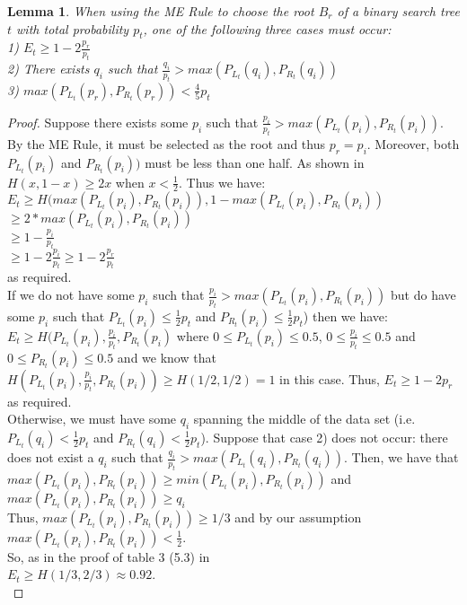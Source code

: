 \documentclass[letterpaper,12pt,titlepage,oneside,final]{book}
\theoremstyle{plain}
\newtheorem{lem}[thm]{Lemma}
\begin{document}
\begin{lem}
When using the ME Rule to choose the root $B_r$ of a binary search tree $t$ with total probability $p_t$, one of the following three cases must occur: \\
1) $E_t \geq 1-2 \frac{p_r}{p_t}$ \\
2) There exists $q_i$ such that $\frac{q_i}{p_t} > max(P_{L_t}(q_i), P_{R_t}(q_i))$\\
3)  $max(P_{L_t}(p_r), P_{R_t}(p_r)) < \frac{4}{5} p_t$\\
\end{lem}
\begin{proof}
Suppose there exists some $p_i$ such that $\frac{p_i}{p_t} > max(P_{L_t}(p_i), P_{R_t}(p_i))$. By the ME Rule, it must be selected as the root and thus $p_r=p_i$. Moreover, both $P_{L_t}(p_i)$ and $P_{R_t}(p_i))$ must be less than one half. As shown in \cite{gallager1968information} $H(x,1-x) \geq 2x$ when $x<\frac{1}{2}$. Thus we have: \\
$E_t \geq H( max(P_{L_t}(p_i), P_{R_t}(p_i)), 1-max(P_{L_t}(p_i), P_{R_t}(p_i))$ \\
$ \geq 2*max(P_{L_t}(p_i), P_{R_t}(p_i))$ \\ $ \geq 1-\frac{p_i}{p_t}$ \\ 
$ \geq 1-2 \frac{p_i}{p_t} \geq 1-2 \frac{p_r}{p_t}$ \\
 as required. \\
 
 If we do not have some $p_i$ such that $\frac{p_i}{p_t} > max(P_{L_t}(p_i), P_{R_t}(p_i))$ but do have some $p_i$ such that $P_{L_t}(p_i) \leq \frac{1}{2}p_t$ and $P_{R_t}(p_i) \leq \frac{1}{2}p_t$) then we have: \\
 $E_t \geq H(P_{L_t}(p_i), \frac{p_i}{p_t} , P_{R_t}(p_i)$ where $0 \leq P_{L_t}(p_i) \leq 0.5$, $0 \leq \frac{p_i}{p_t} \leq 0.5$ and $0 \leq P_{R_t}(p_i) \leq 0.5$  and we know that \\
 $H(P_{L_t}(p_i), \frac{p_i}{p_t} , P_{R_t}(p_i)) \geq H(1/2, 1/2) = 1$ in this case.
 Thus, $E_t \geq 1-2p_r$ as required. \\
 
 Otherwise, we must have some $q_i$ spanning the middle of the data set (i.e. $P_{L_t}(q_i) < \frac{1}{2}p_t$ and $P_{R_t}(q_i) < \frac{1}{2}p_t$). Suppose that case 2) does not occur: there does not exist a $q_i$ such that $\frac{q_i}{p_t} > max(P_{L_t}(q_i), P_{R_t}(q_i))$. Then, we have that \\ $max(P_{L_t}(p_i), P_{R_t}(p_i)) \geq min(P_{L_t}(p_i), P_{R_t}(p_i))$ and \\ $max(P_{L_t}(p_i), P_{R_t}(p_i)) \geq q_i$ \\ Thus, $max(P_{L_t}(p_i), P_{R_t}(p_i)) \geq 1/3$ and by our assumption $max(P_{L_t}(p_i), P_{R_t}(p_i)) < \frac{1}{2}$. \\
 So, as in the proof of table 3 (5.3) in \cite{guttler1980binary}\\
 $E_t \geq H(1/3, 2/3) \approx 0.92$. \\


\end{proof}
\end{document}

